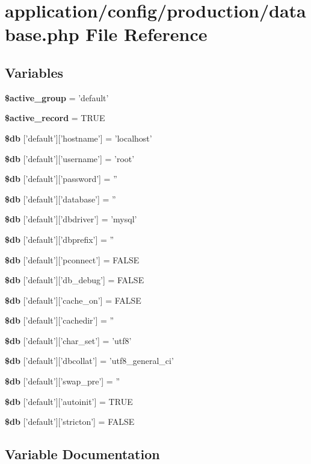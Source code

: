 \section{application/config/production/database.php File Reference}
\label{production_2database_8php}
\subsection*{Variables}
\begin{DoxyCompactItemize}
\item 
{\bf \$active\-\_\-group} = 'default'
\item 
{\bf \$active\-\_\-record} = T\-R\-U\-E
\item 
{\bf \$db} ['default']['hostname'] = 'localhost'
\item 
{\bf \$db} ['default']['username'] = 'root'
\item 
{\bf \$db} ['default']['password'] = ''
\item 
{\bf \$db} ['default']['database'] = ''
\item 
{\bf \$db} ['default']['dbdriver'] = 'mysql'
\item 
{\bf \$db} ['default']['dbprefix'] = ''
\item 
{\bf \$db} ['default']['pconnect'] = F\-A\-L\-S\-E
\item 
{\bf \$db} ['default']['db\-\_\-debug'] = F\-A\-L\-S\-E
\item 
{\bf \$db} ['default']['cache\-\_\-on'] = F\-A\-L\-S\-E
\item 
{\bf \$db} ['default']['cachedir'] = ''
\item 
{\bf \$db} ['default']['char\-\_\-set'] = 'utf8'
\item 
{\bf \$db} ['default']['dbcollat'] = 'utf8\-\_\-general\-\_\-ci'
\item 
{\bf \$db} ['default']['swap\-\_\-pre'] = ''
\item 
{\bf \$db} ['default']['autoinit'] = T\-R\-U\-E
\item 
{\bf \$db} ['default']['stricton'] = F\-A\-L\-S\-E
\end{DoxyCompactItemize}


\subsection{Variable Documentation}
